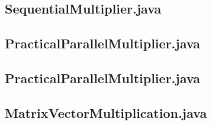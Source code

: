 \documentclass{article}%
\begin{document}
\begin{appendices}
        \subsection*{SequentialMultiplier.java}\label{seq-mult}
        
        
        \subsection*{PracticalParallelMultiplier.java}\label{par-mult}
        
        
        \subsection*{PracticalParallelMultiplier.java}\label{prac-par-mult}
        
        
        \subsection*{MatrixVectorMultiplication.java}\label{mult}
        


\end{appendices}
\end{document}
